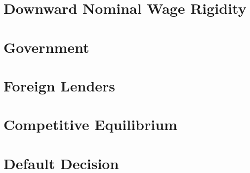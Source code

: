\section{Downward Nominal Wage Rigidity}


\section{Government}


\section{Foreign Lenders}


\section{Competitive Equilibrium}


\section{Default Decision}
